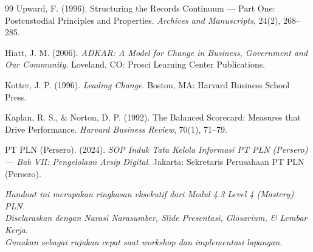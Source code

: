\documentclass[11pt,a4paper]{article}
\begin{document}
\begin{thebibliography}{99}
 Upward, F. (1996). Structuring the Records Continuum --- Part One: Postcustodial Principles and Properties. \textit{Archives and Manuscripts}, 24(2), 268--285.

 Hiatt, J. M. (2006). \textit{ADKAR: A Model for Change in Business, Government and Our Community}. Loveland, CO: Prosci Learning Center Publications.

 Kotter, J. P. (1996). \textit{Leading Change}. Boston, MA: Harvard Business School Press.

 Kaplan, R. S., \& Norton, D. P. (1992). The Balanced Scorecard: Measures that Drive Performance. \textit{Harvard Business Review}, 70(1), 71--79.

 PT PLN (Persero). (2024). \textit{SOP Induk Tata Kelola Informasi PT PLN (Persero) --- Bab VII: Pengelolaan Arsip Digital}. Jakarta: Sekretaris Perusahaan PT PLN (Persero).

\end{thebibliography}

\vfill
\begin{center}
\small\textit{Handout ini merupakan ringkasan eksekutif dari Modul 4.3 Level 4 (Mastery) PLN.\\
Diselaraskan dengan Narasi Narasumber, Slide Presentasi, Glosarium, \& Lembar Kerja.\\
Gunakan sebagai rujukan cepat saat workshop dan implementasi lapangan.}
\end{center}
\end{document}
